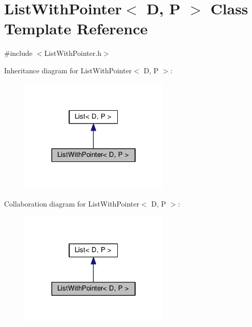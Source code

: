 \hypertarget{classListWithPointer}{}\section{List\+With\+Pointer$<$ D, P $>$ Class Template Reference}
\label{classListWithPointer}


{\ttfamily \#include $<$List\+With\+Pointer.\+h$>$}



Inheritance diagram for List\+With\+Pointer$<$ D, P $>$\+:
\nopagebreak
\begin{figure}[H]
\begin{center}
\leavevmode
\includegraphics[width=202pt]{classListWithPointer__inherit__graph}
\end{center}
\end{figure}


Collaboration diagram for List\+With\+Pointer$<$ D, P $>$\+:
\nopagebreak
\begin{figure}[H]
\begin{center}
\leavevmode
\includegraphics[width=202pt]{classListWithPointer__coll__graph}
\end{center}
\end{figure}
